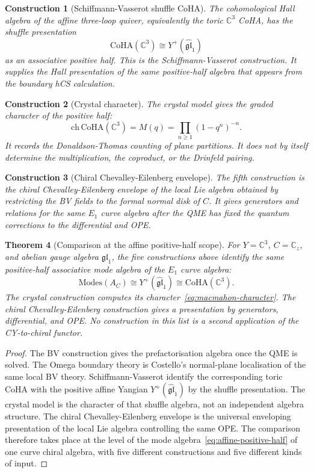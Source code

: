 \documentclass[11pt]{article}
\newtheorem{theorem}{Theorem}
\newtheorem{construction}[theorem]{Construction}
\theoremstyle{remark}
\providecommand{\C}{\mathbb{C}}
\providecommand{\fgl}{\mathfrak{gl}}
\providecommand{\Eone}{E_1}
\providecommand{\CoHA}{\mathrm{CoHA}}
\providecommand{\Yplus}{Y^+}
\providecommand{\Modes}{\mathrm{Modes}}
\begin{document}
\begin{construction}[Schiffmann-Vasserot shuffle CoHA]
The cohomological Hall algebra of the affine three-loop quiver,
equivalently the toric $\C^3$ CoHA, has the shuffle presentation
\[
  \CoHA(\C^3)\cong \Yplus(\widehat{\fgl}_1)
  \label{eq:coha-positive-half}
\]
as an associative positive half.  This is the Schiffmann-Vasserot
construction.  It supplies the Hall presentation of the same
positive-half algebra that appears from the boundary hCS calculation.
\end{construction}

\begin{construction}[Crystal character]
The crystal model gives the graded character of the positive half:
\[
  \mathrm{ch}\,\CoHA(\C^3)
  =
  M(q)
  =
  \prod_{n\ge1}(1-q^n)^{-n}.
  \label{eq:macmahon-character}
\]
It records the Donaldson-Thomas counting of plane partitions.  It does
not by itself determine the multiplication, the coproduct, or the
Drinfeld pairing.
\end{construction}

\begin{construction}[Chiral Chevalley-Eilenberg envelope]
The fifth construction is the chiral Chevalley-Eilenberg envelope of
the local Lie algebra obtained by restricting the BV fields to the
formal normal disk of $C$.  It gives generators and relations for the
same $\Eone$ curve algebra after the QME has fixed the quantum
corrections to the differential and OPE.
\end{construction}

\begin{theorem}[Comparison at the affine positive-half scope]
\label{thm:five-constructions-affine}
For $Y=\C^3$, $C=\C_z$, and abelian gauge algebra $\fgl_1$, the five
constructions above identify the same positive-half associative mode
algebra of the $\Eone$ curve algebra:
\[
  \Modes(A_C)\cong \Yplus(\widehat{\fgl}_1)\cong \CoHA(\C^3).
  \label{eq:affine-positive-half}
\]
The crystal construction computes its character~\eqref{eq:macmahon-character}.
The chiral Chevalley-Eilenberg construction gives a presentation by
generators, differential, and OPE.  No construction in this list is a
second application of the CY-to-chiral functor.
\end{theorem}

\begin{proof}
The BV construction gives the prefactorisation algebra once the QME is
solved.  The Omega boundary theory is Costello's normal-plane
localisation of the same local BV theory.  Schiffmann-Vasserot identify
the corresponding toric CoHA with the positive affine Yangian
$\Yplus(\widehat{\fgl}_1)$ by the shuffle presentation.  The crystal
model is the character of that shuffle algebra, not an independent
algebra structure.  The chiral Chevalley-Eilenberg envelope is the
universal enveloping presentation of the local Lie algebra controlling
the same OPE.  The comparison therefore takes place at the level of the
mode algebra~\eqref{eq:affine-positive-half} of one curve chiral
algebra, with five different constructions and five different kinds of
input.
\end{proof}
\end{document}
